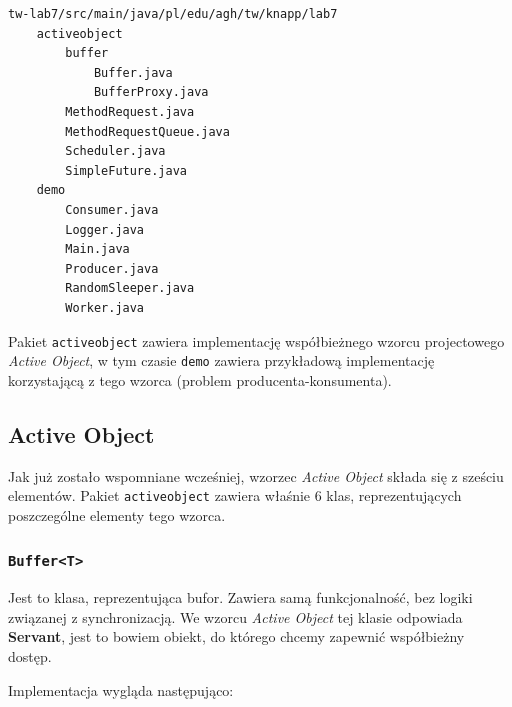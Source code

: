 \documentclass[11pt]{article}
\begin{document}
\begin{verbatim}
tw-lab7/src/main/java/pl/edu/agh/tw/knapp/lab7
    activeobject
        buffer
            Buffer.java
            BufferProxy.java
        MethodRequest.java
        MethodRequestQueue.java
        Scheduler.java
        SimpleFuture.java
    demo
        Consumer.java
        Logger.java
        Main.java
        Producer.java
        RandomSleeper.java
        Worker.java
\end{verbatim}

Pakiet \texttt{activeobject} zawiera implementację współbieżnego wzorcu
projectowego \emph{Active Object}, w tym czasie \texttt{demo} zawiera
przykładową implementację korzystającą z tego wzorca (problem
producenta-konsumenta).

    \hypertarget{active-object}{%
\subsection{Active Object}\label{active-object}}

Jak już zostało wspomniane wcześniej, wzorzec \emph{Active Object}
składa się z sześciu elementów. Pakiet \texttt{activeobject} zawiera
właśnie 6 klas, reprezentujących poszczególne elementy tego wzorca.

    \hypertarget{buffert}{%
\subsubsection{\texorpdfstring{\texttt{Buffer\textless{}T\textgreater{}}}{Buffer\textless T\textgreater{}}}\label{buffert}}

Jest to klasa, reprezentująca bufor. Zawiera samą funkcjonalność, bez
logiki związanej z synchronizacją. We wzorcu \emph{Active Object} tej
klasie odpowiada \textbf{Servant}, jest to bowiem obiekt, do którego
chcemy zapewnić współbieżny dostęp.

Implementacja wygląda następująco:
\end{document}
